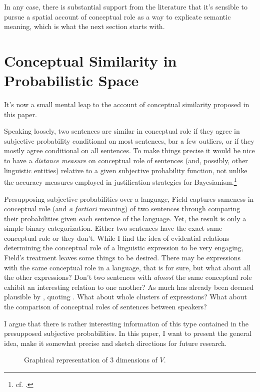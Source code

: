\documentclass[11pt, a4paper]{scrartcl}
\renewcommand{\i}[1]{\emph{#1}}
\newcommand{\m}[1]{\textswab{#1}}
\begin{document}
In any case, there is substantial support from the literature that it's sensible to pursue a spatial account of conceptual role as a way to explicate semantic meaning, which is what the next section starts with.

\section{Conceptual Similarity in Probabilistic Space}

It's now a small mental leap to the account of conceptual similarity proposed in this paper. 

Speaking loosely, two sentences are similar in conceptual role if they agree in subjective probability conditional on most sentences, bar a few outliers, or if they mostly agree conditional on all sentences. To make things precise it would be nice to have a \i{distance measure} on conceptual role of sentences (and, possibly, other linguistic entities) relative to a given subjective probability function, not unlike the accuracy measures employed in justification strategies for Bayesianism.\footnote{cf. \textcite{Leitgeb2010}.}

Presupposing subjective probabilities over a language, Field captures sameness in conceptual role (and \i{a fortiori} meaning) of two sentences through comparing their probabilities given each sentence of the language. Yet, the result is only a simple binary categorization. Either two sentences have the exact same conceptual role or they don't. While I find the idea of evidential relations determining the conceptual role of a linguistic expression to be very engaging, Field's treatment leaves some things to be desired. There may be expressions with the same conceptual role in a language, that is for sure, but what about all the other expressions? Don't two sentences with \i{almost} the same conceptual role exhibit an interesting relation to one another? As much has already been deemed plausible by \textcite{Leitgeb2008-LEIAIR}, quoting \textcite{Goodman1972-GOOPAP-3}. What about whole clusters of expressions? What about the comparison of conceptual roles of sentences between speakers? 

I argue that there is rather interesting information of this type contained in the presupposed subjective probabilities. In this paper, I want to present the general idea, make it somewhat precise and sketch directions for future research.

\begin{figure}
    \centering
{}
\caption{Graphical representation of 3 dimensions of $V$.}
\end{figure}
\end{document}
